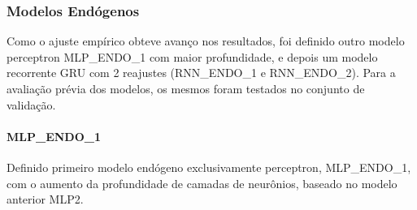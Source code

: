           \subsubsection{Modelos Endógenos}
    	        Como o ajuste empírico obteve avanço nos resultados, foi definido outro modelo perceptron MLP\_ENDO\_1 com maior profundidade, e depois um modelo recorrente GRU com 2 reajustes (RNN\_ENDO\_1 e RNN\_ENDO\_2).
                Para a avaliação prévia dos modelos, os mesmos foram testados no conjunto de validação.\newline
              \paragraph{MLP\_ENDO\_1}
                Definido primeiro modelo endógeno exclusivamente perceptron, MLP\_ENDO\_1, com o aumento da profundidade de camadas de neurônios, baseado no modelo anterior MLP2.
      	        \begin{figure}[H]
                \end{figure}
                
